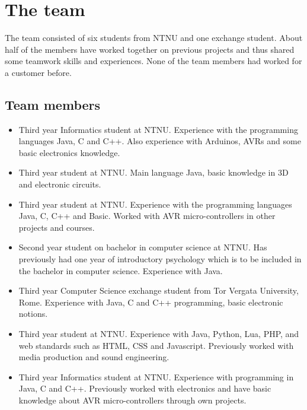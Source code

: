 \section{The team}
The team consisted of six students from NTNU and one exchange student.
About half of the members have worked together on previous projects and thus shared
some teamwork skills and experiences. None of the team members had worked for a customer before.

\subsection{Team members}

\begin{itemize}
\item{\anders}\newline
Third year Informatics student at NTNU. Experience with the programming languages Java,
C and C++. Also experience with Arduinos, AVRs and some basic electronics knowledge.

\item{\henrik}\newline
Third year student at NTNU. Main language Java, basic knowledge in 3D and electronic circuits.

\item{\johan}\newline
Third year student at NTNU. Experience with the programming languages Java, C, C++  and
Basic. Worked with AVR micro-controllers in other projects and courses.

\item{\asbjorn}\newline
Second year student on bachelor in computer science at NTNU. Has previously had one year of
introductory psychology which is to be included in the bachelor in computer science.
Experience with Java.

\item{\emanuele}\newline
Third year Computer Science exchange student from Tor Vergata University, Rome.
Experience with Java, C and C++ programming, basic electronic notions.

\item{\jonas}\newline
Third year student at NTNU. Experience with Java, Python, Lua, PHP, and web standards such as HTML, 
CSS and Javascript. Previously worked with media production and sound engineering.

\item{\bjornar}\newline
Third year Informatics student at NTNU. Experience with programming in Java, C and C++.
Previously worked with electronics and have basic knowledge about AVR micro-controllers through
own projects.
\end{itemize}

